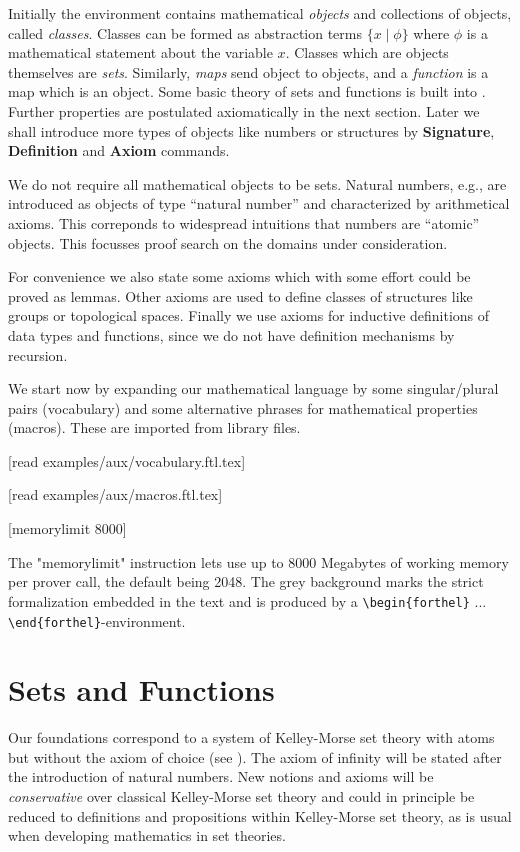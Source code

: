 \documentclass[11pt]{article}
\begin{document}
Initially the environment contains 
mathematical \textit{objects} and collections of objects, called \textit{classes}. Classes can
be formed as abstraction terms $\{x\mid\phi\}$ where $\phi$ is a mathematical
statement about the variable $x$. Classes which are objects themselves are 
\textit{sets}. Similarly, \textit{maps} send object to objects, and a \textit{function}
is a map which is an object.
Some basic theory of sets and functions is built into \Naproche{}. Further properties
are postulated axiomatically in the next section. Later we shall introduce more types 
of objects like numbers or structures 
by \textbf{Signature}, \textbf{Definition} and \textbf{Axiom} commands.

We do not require all mathematical objects to be sets. Natural numbers, e.g., are introduced as objects
of type ``natural number'' and characterized by arithmetical axioms. This correponds to
widespread intuitions that numbers are ``atomic'' objects.
This focusses proof search on the domains under
consideration.

For convenience we also state some axioms which with some effort could be proved as lemmas. 
Other axioms are used to define classes of structures like groups or 
topological spaces. Finally we use axioms for inductive definitions
of data types and functions, since we do not have
definition mechanisms by recursion.

We start now by expanding our mathematical language by some
singular/plural pairs (vocabulary) and some alternative phrases 
for mathematical properties (macros). These are imported from
library files.


\begin{forthel}

[read examples/aux/vocabulary.ftl.tex]

[read examples/aux/macros.ftl.tex]

[memorylimit 8000]

\end{forthel}
%
The "memorylimit" instruction lets \Naproche{} use up to 8000 Megabytes of working memory per prover
call, the default being 2048.
The grey background marks the strict formalization
embedded in the text and is produced by
a
\verb+\+\verb+begin{forthel}+ ...
\verb+\+\verb+end{forthel}+-environment.


\section{Sets and Functions}
Our foundations correspond to a system of Kelley-Morse set theory with atoms 
but without the axiom of choice 
(see \cite{Kelley}). The axiom of infinity will be stated after
the introduction of natural numbers.
New notions and axioms will be \textit{conservative} over classical Kelley-Morse set theory and 
could in principle be reduced to definitions and propositions within
Kelley-Morse set theory, as is usual when developing mathematics in set theories.
\end{document}
